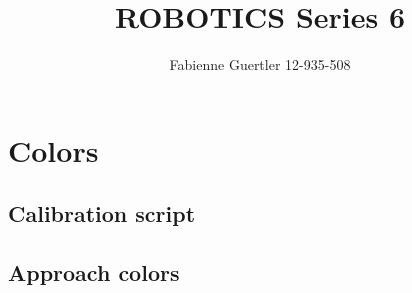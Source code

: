 \documentclass[a4paper]{article}
\title{ROBOTICS Series 6}
\author{Fabienne Guertler 12-935-508}
\begin{document}
	\section{Colors}
		\subsection{Calibration script}
							
		\subsection{Approach colors}
	
\end{document}
